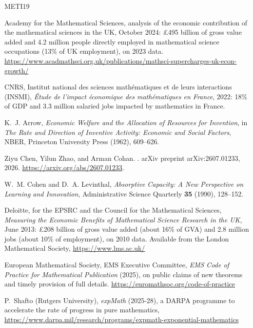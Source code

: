 \documentclass[11pt, a4paper,twosided]{amsart}
\begin{document}
\begin{thebibliography}{METI19}

  Academy for the Mathematical Sciences, analysis of the economic contribution of the mathematical sciences in the UK, October 2024: \pounds495 billion of gross value added and 4.2 million people directly employed in mathematical science occupations (13\% of UK employment), on 2023 data. \url{https://www.acadmathsci.org.uk/publications/mathsci-supercharges-uk-econ-growth/}

  CNRS, Institut national des sciences mathématiques et de leurs interactions (INSMI),
  \emph{Étude de l'impact économique des mathématiques en France}, 2022: 18\% of GDP and 3.3 million salaried jobs impacted by mathematics in France.


  K.~J. Arrow, \emph{Economic Welfare and the Allocation of Resources for Invention}, in \emph{The Rate and Direction of Inventive Activity: Economic and Social Factors}, NBER, Princeton University Press (1962), 609--626.

  Ziyu Chen, Yilun Zhao, and Arman Cohan.
  .
  \newblock arXiv preprint arXiv:2607.01233, 2026.
  \newblock \url{https://arxiv.org/abs/2607.01233}.
  
  W.~M. Cohen and D.~A. Levinthal, \emph{Absorptive Capacity: A New Perspective on Learning and Innovation}, Administrative Science Quarterly \textbf{35} (1990), 128--152.

  Deloitte, for the EPSRC and the Council for the Mathematical Sciences, \emph{Measuring the Economic Benefits of Mathematical Science Research in the UK}, June 2013: \pounds208 billion of gross value added (about 16\% of GVA) and 2.8 million jobs (about 10\% of employment), on 2010 data. Available from the London Mathematical Society, \url{https://www.lms.ac.uk/}

  European Mathematical Society, EMS Executive Committee, \emph{EMS Code of Practice for Mathematical Publication} (2025), on public claims of new theorems and timely provision of full details. \url{https://euromathsoc.org/code-of-practice}

  P.~Shafto (Rutgers University), \emph{expMath} (2025-28), a DARPA programme to accelerate the rate of progress in pure mathematics, \url{https://www.darpa.mil/research/programs/expmath-exponential-mathematics} 


\end{thebibliography}
\end{document}
